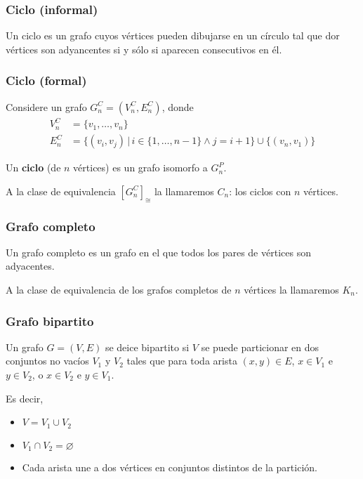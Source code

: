 \begin{multicols}{2}
    \subsubsection*{Ciclo (informal)}
    Un ciclo es un grafo cuyos vértices pueden dibujarse en un círculo tal que dor vértices son adyancentes si y sólo si aparecen consecutivos en él.
    
    \subsubsection*{Ciclo (formal)}
    Considere un grafo $G_n^C = (V_n^C, E_n^C)$, donde 
    \begin{align*}
        V_n^C &= \{ v_1, \ldots, v_n \} \\ 
        E_n^C &= \{ (v_i, v_j) \,|\, i \in \{1,\ldots, n - 1\} \wedge j = i + 1\} \cup \{ (v_n, v_1) \}
    \end{align*}
    
    Un \textbf{ciclo} (de $n$ vértices) es un grafo isomorfo a $G_n^P$. \p
    
    A la clase de equivalencia $[G_n^C]_{\cong}$ la llamaremos $C_n$: los ciclos con $n$ vértices.
    
    \subsubsection*{Grafo completo}
    Un grafo completo es un grafo en el que todos los pares de vértices son adyacentes. \p
    
    A la clase de equivalencia de los grafos completos de $n$ vértices la llamaremos $K_n$.
    
    \subsubsection*{Grafo bipartito}
    Un grafo $G = (V,E)$ se deice bipartito si $V$ se puede particionar en dos conjuntos no vacíos $V_1$ y $V_2$ tales que para toda arista $(x,y) \in E$, $x \in V_1$ e $y \in V_2$, o $x \in V_2$ e $y \in V_1$. \p
    
    Es decir,
    \begin{itemize}
        \item $V = V_1 \cup V_2$
        \item $V_1 \cap V_2 = \varnothing$
        \item Cada arista une a dos vértices en conjuntos distintos de la partición.
    \end{itemize}
    

\end{multicols}
